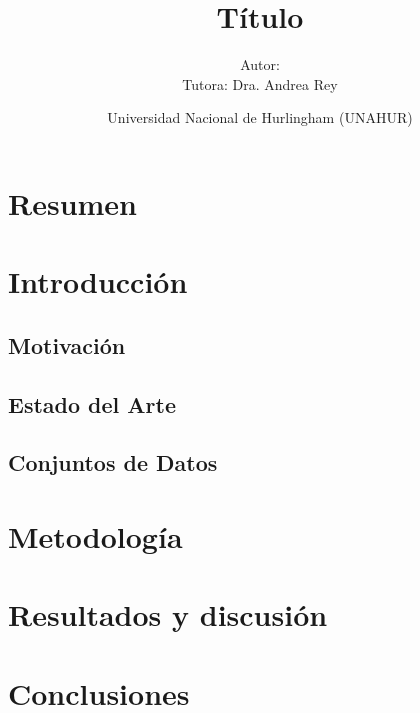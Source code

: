 \documentclass[a4paper,10pt]{book}
\title{Título}
\author{Autor:  \\ Tutora: Dra. Andrea Rey}
\date{Universidad Nacional de Hurlingham (UNAHUR)}
\renewcommand{\listfigurename}{\'Indice de Figuras}
\renewcommand{\listtablename}{\'Indice de Tablas}
\begin{document}
\maketitle


	\tableofcontents
	
	\renewcommand{\listfigurename}{Índice de Figuras}
	\listoffigures
	
    \renewcommand{\listtablename}{Índice de Tablas}
	\listoftables



\chapter*{Resumen}

\noindent



\chapter{Introducción}



\section{Motivación}

\section{Estado del Arte}

\section{Conjuntos de Datos}


\chapter{Metodología}
\label{Sec:Métodos}


\chapter{Resultados y discusión}
\label{ch:resultados}


\chapter{Conclusiones}



\end{document}
